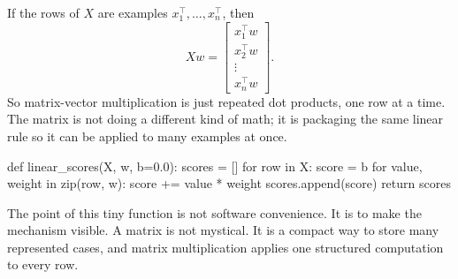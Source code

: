 \begin{mathlens}
If the rows of \(X\) are examples \(x_1^\top,\ldots,x_n^\top\), then
\[
Xw=
\begin{bmatrix}
x_1^\top w\\
x_2^\top w\\
\vdots\\
x_n^\top w
\end{bmatrix}.
\]
So matrix-vector multiplication is just repeated dot products, one row at a time. The matrix is not doing a different kind of math; it is packaging the same linear rule so it can be applied to many examples at once.
\end{mathlens}

\begin{codeexample}
def linear_scores(X, w, b=0.0):
    scores = []
    for row in X:
        score = b
        for value, weight in zip(row, w):
            score += value * weight
        scores.append(score)
    return scores
\end{codeexample}

The point of this tiny function is not software convenience. It is to make the mechanism visible. A matrix is not mystical. It is a compact way to store many represented cases, and matrix multiplication applies one structured computation to every row.

